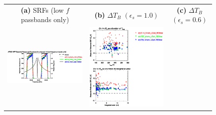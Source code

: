 \begin{figure}[H]
  \centering
  \begin{tabular}{c c c}
    \textsf{\textbf{(a)} SRFs (low $f$ passbands only)} &
    \textsf{\textbf{(b)} $\Delta T_B$ $(\epsilon_s = 1.0)$} &
    \textsf{\textbf{(c)} $\Delta T_B$ $(\epsilon_s = 0.6)$} \\
    \includegraphics[bb=80 400 280 558,clip,scale=0.85]{graphics/srf/Tset/atms_npp.ch14.osrf.eps} &
    \includegraphics[bb=85 400 260 558,clip,scale=0.85]{graphics/dtb/Tset/e1.0_r0.0/atms_npp.ch14.dTb.eps} & 

\end{tabular}
\end{figure}
